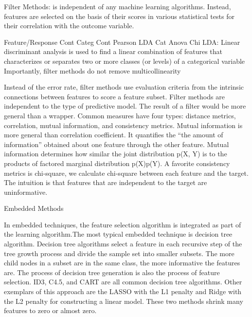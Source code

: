 \documentclass[preprint,12pt]{elsarticle}
\begin{document}
Filter Methods: is independent of any machine learning algorithms. Instead, features are selected on the basis of their scores in various statistical tests for their correlation with the outcome variable. 

Feature/Response  Cont      Categ
Cont 			  Pearson	LDA
Cat               Anova     Chi 
LDA: Linear discriminant analysis is used to find a linear combination of features that characterizes or separates two or more classes (or levels) of a categorical variable
Importantly, filter methods do not remove multicollinearity

Instead of the error rate, filter methods use evaluation criteria from the intrinsic connections between features to score a feature subset. Filter methods are independent to the type of predictive model. The result of a filter would be more general than a wrapper. Common measures have four types: distance metrics, correlation, mutual information, and consistency metrics. Mutual information is more general than correlation coefficient. It quantifies the “the amount of information” obtained about one feature through the other feature. Mutual information determines how similar the joint distribution p(X, Y) is to the products of factored marginal distribution p(X)p(Y). 
A favorite consistency metrics is chi-square, we calculate chi-square between each feature and the target. The intuition is that features that are independent to the target are uninformative.

Embedded Methods

In embedded techniques, the feature selection algorithm is integrated as part of the learning algorithm.The most typical embedded technique is decision tree algorithm. Decision tree algorithms select a feature in each recursive step of the tree growth process and divide the sample set into smaller subsets. The more child nodes in a subset are in the same class, the more informative the features are. The process of decision tree generation is also the process of feature selection. ID3, C4.5, and CART are all common decision tree algorithms.
Other exemplars of this approach are the LASSO with the L1 penalty and Ridge with the L2 penalty for constructing a linear model. These two methods shrink many features to zero or almost zero.
\end{document}
